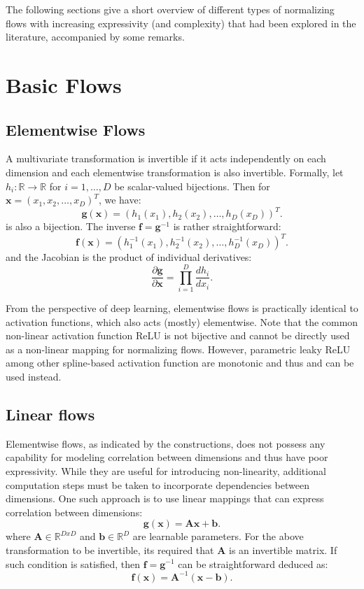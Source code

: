The following sections give a short overview of different types of normalizing
flows with increasing expressivity (and complexity) that had been explored in
the literature, accompanied by some remarks.

\section{Basic Flows}
\subsection{Elementwise Flows}
A multivariate transformation is invertible if it acts independently on each
dimension and each elementwise transformation is also invertible. Formally, let $h_i:
\mathbb{R} \to \mathbb{R}$ for $i=1,\ldots,D$ be scalar-valued bijections. Then
for $\mathbf{x} = (x_1, x_2, \ldots, x_D)^T$, we have:
$$
\mathbf{g}(\mathbf{x}) = (h_1(x_1), h_2(x_2), \ldots, h_D(x_D))^T
.$$
is also a bijection. The inverse $\mathbf{f} = \mathbf{g}^{-1}$ is rather straightforward:
$$
\mathbf{f}(\mathbf{x}) = (h_1^{-1}(x_1), h_2^{-1}(x_2), \ldots, h_D^{-1}(x_D))^T
.$$
and the Jacobian is the product of individual derivatives:
$$
\frac{\partial \mathbf{g}}{\partial \mathbf{x} } = \prod_{i=1}^D \frac{d h_i}{d x_i}
.$$

From the perspective of deep learning, elementwise flows is practically
identical to activation functions, which also acts (mostly) elementwise.
Note that the common non-linear activation function ReLU is not bijective and
cannot be directly used as a non-linear mapping for normalizing flows. However,
parametric leaky ReLU among other spline-based activation function are monotonic
and thus and can be used instead.

\subsection{Linear flows}

Elementwise flows, as indicated by the constructions, does not possess any
capability for modeling correlation between dimensions and thus have poor
expressivity. While they are useful for introducing non-linearity, additional
computation steps must be taken to incorporate dependencies between
dimensions. One such approach is to use linear mappings that can express
correlation between dimensions:
$$
\mathbf{g(x)} = \mathbf{Ax} + \mathbf{b}
.$$
where $\mathbf{A} \in  \mathbb{R}^{DxD}$ and $\mathbf{b} \in  \mathbb{R}^D$ are
learnable parameters. For the above transformation to be invertible, its
required that $\mathbf{A}$ is an invertible matrix. If such condition is
satisfied, then $\mathbf{f} = \mathbf{g}^{-1}$ can be straightforward deduced as:
$$
\mathbf{f(x)} = \mathbf{A}^{-1}(\mathbf{x} - \mathbf{b})
.$$

